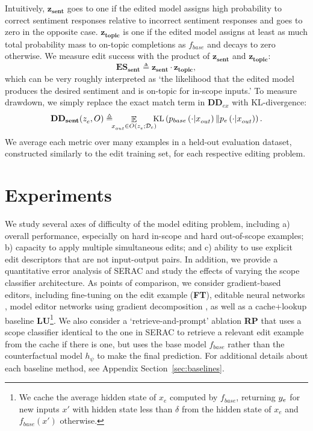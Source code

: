\documentclass{article}
\newcommand{\basemodel}{f_{base}}
\newcommand{\pbase}{p_{base}}
\newcommand{\pedited}{p_{e}}
\newcommand{\rep}{h_\psi}
\newcommand{\name}{SERAC}
\newcommand{\editdata}{\mathcal{D}_{e}}
\newcommand{\ze}[1][]{z_e^{#1}}
\newcommand{\xe}{x_e}
\newcommand{\ye}[1][]{\ifthenelse{\equal{#1}{}}{y_e}{y_e(#1)}}
\newcommand{\xloc}[1][]{x_{out}^{#1}}
\DeclareMathOperator*{\E}{\mathbb{E}}
\begin{document}
Intuitively, $\mathbf{z_{sent}}$ goes to one if the edited model assigns high probability to correct sentiment responses relative to incorrect sentiment responses and goes to zero in the opposite case. $\mathbf{z_{topic}}$ is one if the edited model assigns at least as much total probability mass to on-topic completions as $\basemodel$ and decays to zero otherwise. We measure edit success with the product of $\mathbf{z_{sent}}$ and $\mathbf{z_{topic}}$:
\begin{equation}
    \mathbf{ES_{sent}} \triangleq \mathbf{z_{sent}} \cdot \mathbf{z_{topic}},
\end{equation}
which can be very roughly interpreted as `the likelihood that the edited model produces the desired sentiment and is on-topic for in-scope inputs.' To measure drawdown, we simply replace the exact match term in $\mathbf{DD}_{ex}$ with KL-divergence:
\begin{equation}
    \small
    \mathbf{DD_{sent}}(\ze,O) \triangleq \hspace{-1.5mm}\E_{\xloc \in\\  O(\ze; \editdata)}\hspace{-2mm} \text{KL}\left(\pbase\left(\cdot|\xloc\right) \| \pedited\left(\cdot|\xloc\right)\right).
\end{equation}
We average each metric over many examples in a held-out evaluation dataset, constructed similarly to the edit training set, for each respective editing problem.

\section{Experiments}
\label{sec:expts}
We study several axes of difficulty of the model editing problem, including a) overall performance, especially on hard in-scope and hard out-of-scope examples; b) capacity to apply multiple simultaneous edits; and c) ability to use explicit edit descriptors that are not input-output pairs. In addition, we provide a quantitative error analysis of {\name} and study the effects of varying the scope classifier architecture. As points of comparison, we consider gradient-based editors, including fine-tuning on the edit example (\textbf{FT}), editable neural networks \citep[\textbf{ENN};][]{Sinitsin2020Editable}, model editor networks using gradient decomposition \citep[\textbf{MEND};][]{mitchell2021fast}, as well as a cache+lookup baseline \textbf{LU}\footnote{We cache the average hidden state of $\xe$ computed by $\basemodel$, returning $\ye$ for new inputs $x'$ with hidden state less than $\delta$ from the hidden state of $\xe$ and $\basemodel(x')$ otherwise.}. We also consider a `retrieve-and-prompt' ablation \textbf{RP} that uses a scope classifier identical to the one in {\name} to retrieve a relevant edit example from the cache if there is one, but uses the base model $\basemodel$ rather than the counterfactual model $\rep$ to make the final prediction. For additional details about each baseline method, see Appendix Section~\ref{sec:baselines}.
\end{document}
